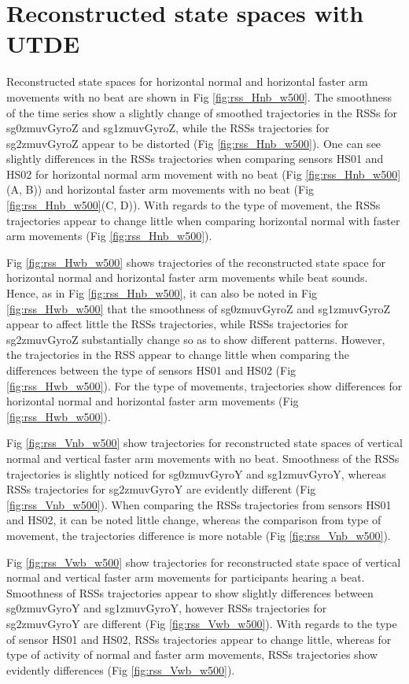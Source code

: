 \section{Reconstructed state spaces with UTDE}
Reconstructed state spaces for horizontal normal and horizontal faster 
arm movements with no beat are shown in Fig \ref{fig:rss_Hnb_w500}.
The smoothness of the time series show a slightly change of smoothed 
trajectories in the RSSs for sg0zmuvGyroZ and sg1zmuvGyroZ, while the 
RSSs trajectories for sg2zmuvGyroZ appear to be distorted 
(Fig \ref{fig:rss_Hnb_w500}).
One can see slightly differences in the RSSs trajectories when comparing 
sensors HS01 and HS02 for horizontal normal arm movement with no beat 
(Fig \ref{fig:rss_Hnb_w500}(A, B)) and horizontal faster arm movements 
with no beat (Fig \ref{fig:rss_Hnb_w500}(C, D)).
With regards to the type of movement, the RSSs trajectories appear 
to change little when comparing horizontal normal with faster arm movements 
(Fig \ref{fig:rss_Hnb_w500}).

Fig \ref{fig:rss_Hwb_w500} shows trajectories of the reconstructed 
state space for horizontal normal and horizontal faster arm movements 
while beat sounds. Hence, as in Fig \ref{fig:rss_Hnb_w500}, 
it can also be noted in Fig \ref{fig:rss_Hwb_w500} that the smoothness 
of sg0zmuvGyroZ and sg1zmuvGyroZ appear to affect little the RSSs 
trajectories, while RSSs trajectories for sg2zmuvGyroZ substantially change 
so as to show different patterns. However, the trajectories in the RSS 
appear to change little when comparing the differences between the type 
of sensors HS01 and HS02 (Fig \ref{fig:rss_Hwb_w500}).
For the type of movements, trajectories show differences for horizontal
normal and horizontal faster arm movements (Fig \ref{fig:rss_Hwb_w500}).

Fig \ref{fig:rss_Vnb_w500} show trajectories for reconstructed state spaces
of vertical normal and vertical faster arm movements with no beat. 
Smoothness of the RSSs trajectories is slightly noticed for sg0zmuvGyroY and
sg1zmuvGyroY, whereas RSSs trajectories for sg2zmuvGyroY are evidently 
different (Fig \ref{fig:rss_Vnb_w500}).
When comparing the RSSs trajectories from sensors HS01 and HS02,
it can be noted little change, whereas the comparison from type of movement, 
the trajectories difference is more notable (Fig \ref{fig:rss_Vnb_w500}).

Fig \ref{fig:rss_Vwb_w500} show trajectories for reconstructed state space
of vertical normal and vertical faster arm movements for participants 
hearing a beat. Smoothness of RSSs trajectories appear to show slightly 
differences between sg0zmuvGyroY and sg1zmuvGyroY, however RSSs trajectories 
for sg2zmuvGyroY are different (Fig \ref{fig:rss_Vwb_w500}).
With regards to the type of sensor HS01 and HS02, RSSs trajectories appear 
to change little, whereas for type of activity of normal and faster arm 
movements, RSSs trajectories show evidently differences 
(Fig \ref{fig:rss_Vwb_w500}).


